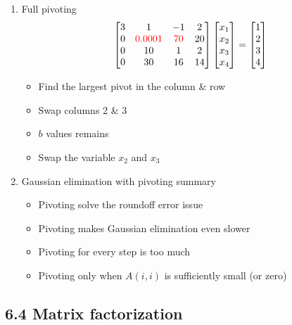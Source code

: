 \documentclass{article}
\theoremstyle{remark}
\begin{document}
\begin{enumerate}
\begin{enumerate}
\item Full pivoting
$$
\begin{bmatrix}
3 & 1 & -1 & 2\\
0 & {\color{red} 0.0001} & {\color{red}70} & 20 \\
0 & 10 & 1 & 2\\
0 & 30 & 16 & 14
\end{bmatrix} \begin{bmatrix}
x_1\\x_2\\x_3\\x_4
\end{bmatrix} = \begin{bmatrix}
1\\2\\3\\4
\end{bmatrix}
$$
\begin{itemize}
\item Find the largest pivot in the column \& row
\item Swap columns 2 \& 3
\item $b$ values remains
\item Swap the variable $x_2$ and $x_3$
\end{itemize}

\item Gaussian elimination with pivoting summary
\begin{itemize}
\item Pivoting solve the roundoff error issue
\item Pivoting makes Gaussian elimination even slower
\item Pivoting for every step is too much	
\item Pivoting only when $A(i,i)$ is sufficiently small (or zero)
\end{itemize}
\end{enumerate}
\end{enumerate}


\subsection{6.4 Matrix factorization}
\end{document}
